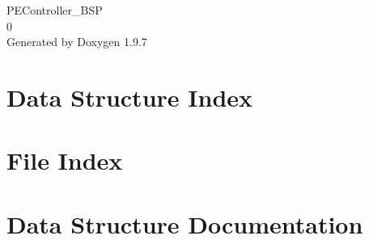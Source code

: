 \documentclass[twoside]{book}
\newcommand{\+}{\discretionary{\mbox{\scriptsize$\hookleftarrow$}}{}{}}
\newcommand{\clearemptydoublepage}{%
    \newpage{\pagestyle{empty}\cleardoublepage}%
  }
\begin{document}
  \raggedbottom
    \hypersetup{pageanchor=false,
                bookmarksnumbered=true,
                pdfencoding=unicode
               }
  \begin{titlepage}
  \vspace*{7cm}
  \begin{center}%
  {\Large PEController\+\_\+\+BSP}\\
  [1ex]\large 0 \\
  \vspace*{1cm}
  {\large Generated by Doxygen 1.9.7}\\
  \end{center}
  \end{titlepage}
  \clearemptydoublepage
  \tableofcontents
  \clearemptydoublepage
  \hypersetup{pageanchor=true}
\chapter{Data Structure Index}

\chapter{File Index}

\chapter{Data Structure Documentation}

\end{document}
